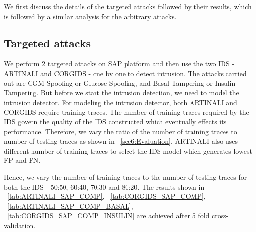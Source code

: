 We first discuss the details of the targeted attacks followed by their results, which is followed by a similar analysis for the arbitrary attacks.

\subsection{Targeted attacks}
We perform 2 targeted attacks on SAP platform and then use the two IDS - ARTINALI and CORGIDS - one by one to detect intrusion. The attacks carried out are CGM Spoofing or Glucose Spoofing, and Basal Tampering or Insulin Tampering. But before we start the intrusion detection, we need to model the intrusion detector. For modeling the intrusion detector, both ARTINALI and CORGIDS require training traces. The number of training traces required by the IDS govern the quality of the IDS constructed which eventually effects its performance. Therefore, we vary the ratio of the number of training traces to number of testing traces as shown in ~\autoref{sec6:Evaluation}. ARTINALI also uses different number of training traces to select the IDS model which generates lowest FP and FN.

Hence, we vary the number of training traces to the number of testing traces for both the IDS - 50:50, 60:40, 70:30 and 80:20. The results shown in ~\autoref{tab:ARTINALI_SAP_COMP}, ~\autoref{tab:CORGIDS_SAP_COMP}, ~\autoref{tab:ARTINALI_SAP_COMP_BASAL}, ~\autoref{tab:CORGIDS_SAP_COMP_INSULIN} are achieved after 5 fold cross-validation.

\begin{table}
\centering
  \caption{Results of intrusion detection by ARTINALI for CGM Spoofing attack on SAP platform}
  \label{tab:ARTINALI_SAP_COMP}
\end{table}


\begin{table}
\centering
  \caption{Results of intrusion detection by CORGIDS for Glucose Spoofing attack on SAP platform}
  \label{tab:CORGIDS_SAP_COMP}
\end{table}


